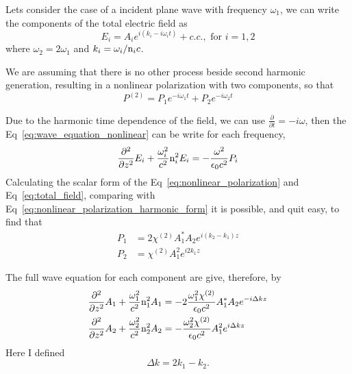 Lets consider the case of a incident plane wave with frequency $\omega_1$, we can write the components of the total electric field as    
\begin{equation}
    E_i = A_ie^{i(k_i-i\omega_i t)} + c.c., \text{ for $i = 1,2$}
\end{equation}
where $\omega_2 = 2\omega_1$ and $k_i = \omega_i/\text{n}_ic$. 

We are assuming that there is no other process beside second harmonic generation, resulting in a nonlinear polarization with two components, so that   
\begin{equation}
    P^{(2)} = P_1e^{-i\omega_1 t}+P_2e^{-i\omega_2 t}
    \label{eq:nonlinear_polarization_harmonic_form}
\end{equation}

Due to the harmonic time dependence of the field, we can use $\frac{\partial}{\partial t} = -i\omega$, then the Eq~\ref{eq:wave_equation_nonlinear} can be write for each frequency, 
\begin{equation}
    \frac{\partial^2}{\partial z^2}E_i +\frac{\omega_i^2}{c^2}\text{n}_i^2 E_i = -\frac{\omega^2}{\epsilon_0 c^2} P_i
\end{equation}
Calculating the scalar form of the Eq~\ref{eq:nonlinear_polarization} and Eq~\ref{eq:total_field}, comparing with Eq~\ref{eq:nonlinear_polarization_harmonic_form} it is possible, and quit easy, to find that
\begin{subequations}
    \begin{align}
        P_1 &= 2\chi^{(2)} A^*_1 A_2e^{i(k_2-k_1)z}\\
        P_2 &= \chi^{(2)} A_1^2e^{i2k_1z}
    \end{align}
\end{subequations}

The full wave equation for each component are give, therefore, by 
\begin{subequations}
    \begin{align}
       \frac{\partial^2}{\partial z^2}A_1 +\frac{\omega_1^2}{c^2}\text{n}_1^2 A_1 &= -2\frac{\omega_1^2 \chi^{(2)}}{\epsilon_0 c^2} A^*_1 A_2e^{-i\Delta kz}\\
       \frac{\partial^2}{\partial z^2}A_2 +\frac{\omega_2^2}{c^2}\text{n}_2^2 A_2 &= -\frac{\omega_2^2\chi^{(2)}}{\epsilon_0 c^2} A_1^2e^{i\Delta k z}
    \end{align}
    \label{eq:coupled_wave_equation_SHC}
\end{subequations}
Here I defined 
\begin{equation}
    \Delta k = 2k_1 - k_2.
\end{equation}

